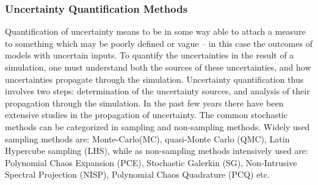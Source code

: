 \documentclass{article}
\begin{document}
\subsubsection{Uncertainty Quantification Methods} Quantification of uncertainty means to be in some way able to attach a measure
to something which may be poorly defined or vague \citep{Matthies2008, nobile2008sparse} -- in this case the outcomes of models 
with uncertain inputs. 
To quantify the uncertainties in the result of a simulation, one must understand 
both the sources of these uncertainties, and how uncertainties propagate through the simulation. 
Uncertainty quantification thus involves two steps: determination of the uncertainty sources, and 
analysis of their propagation through the simulation. In the past few years there have been 
extensive studies in the propagation of uncertainty. The common stochastic methods can be
categorized in sampling and non-sampling methods. Widely used sampling methods
are: Monte-Carlo(MC), quasi-Monte Carlo (QMC), Latin Hypercube sampling (LHS), while as 
non-sampling methods intensively used are:  Polynomial Chaos Expansion (PCE), Stochastic Galerkin (SG),
Non-Intrusive Spectral Projection (NISP), Polynomial Chaos Quadrature (PCQ) etc. 
\end{document}
